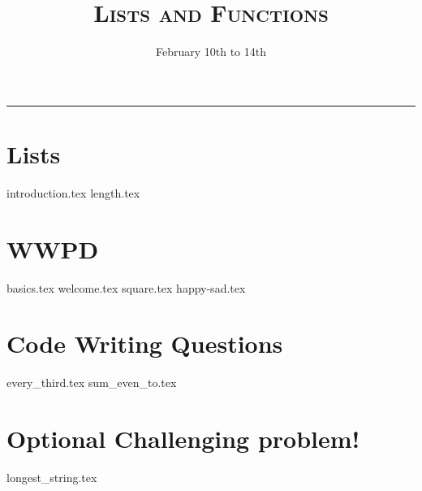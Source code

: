 \documentclass{exam}
\title{\textsc{Lists and Functions}}
\date{February 10th to 14th}
\begin{document}
\maketitle
\rule{\textwidth}{0.15em}
\fontsize{12}{15}\selectfont


\section{Lists}
\begin{questions}
{introduction.tex}
{length.tex}
\newpage
\section{WWPD}
{basics.tex}
\vspace{3em}
{welcome.tex}
\newpage
{square.tex}
{happy-sad.tex}

\newpage
\section{Code Writing Questions}
{every_third.tex}
{sum_even_to.tex}
\newpage
\section{Optional Challenging problem!}
{longest_string.tex}

\end{questions}
\end{document}
